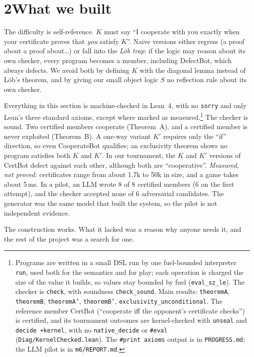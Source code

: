\documentclass[11pt]{article}
\begin{document}
\section*{2\quad What we built}

The difficulty is self-reference. $K$ must say ``I cooperate with you exactly when your certificate proves that \emph{you} satisfy $K$''. Naive versions either regress (a proof about a proof about\ldots) or fall into the \emph{Löb trap}: if the logic may reason about its own checker, every program becomes a member, including DefectBot, which always defects. We avoid both by defining $K$ with the diagonal lemma instead of Löb's theorem, and by giving our small object logic $S$ no reflection rule about its own checker.

Everything in this section is machine-checked in Lean~4, with no \texttt{sorry} and only Lean's three standard axioms, except where marked as measured.\footnote{Programs are written in a small DSL run by one fuel-bounded interpreter \texttt{run}, used both for the semantics and for play; each operation is charged the size of the value it builds, so values stay bounded by fuel (\texttt{eval\_sz\_le}). The checker is \texttt{check}, with soundness \texttt{check\_sound}. Main results: \texttt{theoremA}, \texttt{theoremB}, \texttt{theoremA'}, \texttt{theoremB'}, \texttt{exclusivity\_unconditional}. The reference member CertBot (``cooperate iff the opponent's certificate checks'') is certified, and its tournament outcomes are kernel-checked with \texttt{unseal} and \texttt{decide +kernel}, with no \texttt{native\_decide} or \texttt{\#eval} (\texttt{Diag/KernelChecked.lean}). The \texttt{\#print axioms} output is in \texttt{PROGRESS.md}; the LLM pilot is in \texttt{m6/REPORT.md}.} The checker is sound. Two certified members cooperate (Theorem~A), and a certified member is never exploited (Theorem~B). A one-way variant $K'$ requires only the ``if'' direction, so even CooperateBot qualifies; an exclusivity theorem shows no program satisfies both $K$ and $K'$. In our tournament, the $K$ and $K'$ versions of CertBot defect against each other, although both are ``cooperative''. \emph{Measured, not proved:} certificates range from about 1.7k to 50k in size, and a game takes about 5\,ms. In a pilot, an LLM wrote 8 of 8 certified members (6 on the first attempt), and the checker accepted none of 6 adversarial candidates. The generator was the same model that built the system, so the pilot is not independent evidence.

The construction works. What it lacked was a reason why anyone needs it, and the rest of the project was a search for one.
\end{document}
